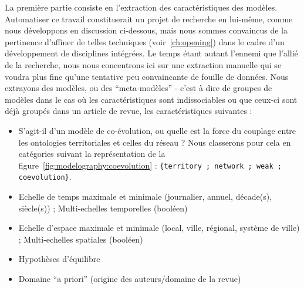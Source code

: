 La première partie consiste en l'extraction des caractéristiques des modèles. Automatiser ce travail constituerait un projet de recherche en lui-même, comme nous développons en discussion ci-dessous, mais nous sommes convaincus de la pertinence d'affiner de telles techniques (voir~\ref{ch:opening}) dans le cadre d'un développement de disciplines intégrées. Le temps étant autant l'ennemi que l'allié de la recherche, nous nous concentrons ici sur une extraction manuelle qui se voudra plus fine qu'une tentative peu convaincante de fouille de données. Nous extrayons des modèles, ou des ``meta-modèles'' - c'est à dire de groupes de modèles dans le cas où les caractéristiques sont indissociables ou que ceux-ci sont déjà groupés dans un article de revue, les caractéristiques suivantes :

\begin{itemize}
\item S'agit-il d'un modèle de co-évolution, ou quelle est la force du couplage entre les ontologies territoriales et celles du réseau ? Nous classerons pour cela en catégories suivant la représentation de la figure~\ref{fig:modelography:coevolution} : \texttt{\{territory ; network ; weak ; coevolution\}}.
\item Echelle de temps maximale et minimale (journalier, annuel, décade(s), siècle(s)) ; Multi-echelles temporelles (booléen)
\item Echelle d'espace maximale et minimale (local, ville, régional, système de ville) ; Multi-echelles spatiales (booléen)
\item Hypothèses d'équilibre
\item Domaine ``a priori'' (origine des auteurs/domaine de la revue)
\end{itemize}



